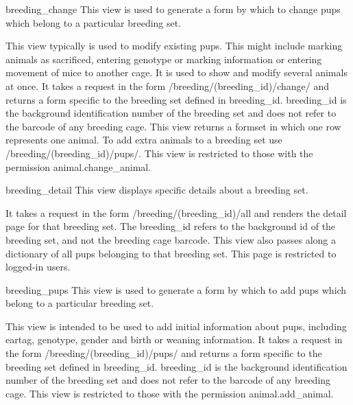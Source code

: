 \documentclass[letterpaper,10pt,english]{sphinxmanual}
\begin{document}
\hypertarget{animal.views.breeding\_change}{}\begin{memberdesc}{breeding\_change}
This view is used to generate a form by which to change pups which belong to a particular breeding set.

This view typically is used to modify existing pups.  This might include marking animals as sacrificed, entering genotype or marking information or entering movement of mice to another cage.  It is used to show and modify several animals at once.
It takes a request in the form /breeding/(breeding\_id)/change/ and returns a form specific to the breeding set defined in breeding\_id.  breeding\_id is the background identification number of the breeding set and does not refer to the barcode of any breeding cage.
This view returns a formset in which one row represents one animal.  To add extra animals to a breeding set use /breeding/(breeding\_id)/pups/.
This view is restricted to those with the permission animal.change\_animal.
\end{memberdesc}

\hypertarget{animal.views.breeding\_detail}{}\begin{memberdesc}{breeding\_detail}
This view displays specific details about a breeding set.

It takes a request in the form /breeding/(breeding\_id)/all and renders the detail page for that breeding set.
The breeding\_id refers to the background id of the breeding set, and not the breeding cage barcode.
This view also passes along a dictionary of all pups belonging to that breeding set.
This page is restricted to logged-in users.
\end{memberdesc}

\hypertarget{animal.views.breeding\_pups}{}\begin{memberdesc}{breeding\_pups}
This view is used to generate a form by which to add pups which belong to a particular breeding set.

This view is intended to be used to add initial information about pups, including eartag, genotype, gender and birth or weaning information.
It takes a request in the form /breeding/(breeding\_id)/pups/ and returns a form specific to the breeding set defined in breeding\_id.  breeding\_id is the background identification number of the breeding set and does not refer to the barcode of any breeding cage.
This view is restricted to those with the permission animal.add\_animal.
\end{memberdesc}
\end{document}
